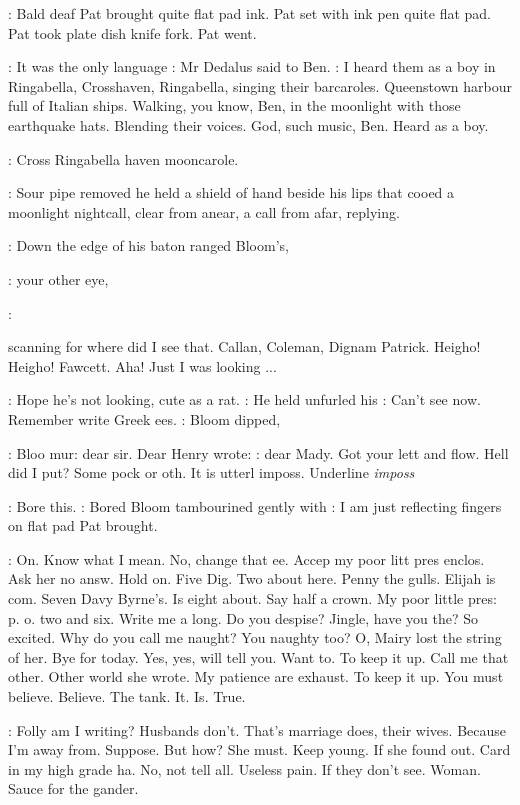 :
Bald deaf Pat brought quite flat pad ink. Pat set with ink pen quite
flat pad. Pat took plate dish knife fork. Pat went.

\Simon:
It was the only language
:
Mr Dedalus said to Ben.
\Simon:
I heard them as a
boy in Ringabella, Crosshaven, Ringabella,
singing their barcaroles.
Queenstown harbour full of Italian ships. Walking, you know, Ben, in the
moonlight with those earthquake hats. Blending their voices. God, such
music, Ben. Heard as a boy.

\BloomQ:
Cross Ringabella haven mooncarole.

:
Sour pipe removed he held a shield of hand beside his lips that cooed
a moonlight nightcall, clear from anear, a call from afar, replying.

:
Down the edge of his  baton ranged Bloom's,

\BloomQ:
your other eye,

\BloomInt:

scanning for where did I see that. Callan, Coleman, Dignam Patrick.
Heigho! Heigho! Fawcett. Aha! Just I was looking ...

\BloomInt:
Hope he's not looking, cute as a rat.
:
He held unfurled his 
\BloomInt:
Can't see now. Remember write Greek ees.
:
Bloom dipped,

\BloomInt:
Bloo mur: dear sir. Dear Henry wrote:
\BloomInt:
dear Mady. Got your lett and flow. Hell did I put?
Some pock or oth. It is utterl imposs. Underline
\emph{imposs}

\BloomInt:
Bore this.
:
Bored Bloom tambourined gently with
\BloomInt:
I am just reflecting
fingers on flat pad Pat brought.

\BloomInt:
On. Know what I mean. No, change that ee. Accep my poor litt pres
enclos. Ask her no answ. Hold on. Five Dig. Two about here. Penny the
gulls. Elijah is com. Seven Davy Byrne's. Is eight about. Say half a
crown. My poor little pres: p. o. two and six. Write me a long. Do you
despise? Jingle, have you the? So excited. Why do you call me naught?
You naughty too?
O, Mairy lost the string of her. Bye for today. Yes, yes,
will tell you. Want to. To keep it up. Call me that other. Other world she
wrote. My patience are exhaust. To keep it up. You must believe. Believe.
The tank. It. Is. True.

\BloomInt:
Folly am I writing? Husbands don't. That's marriage does, their
wives. Because I'm away from. Suppose. But how? She must. Keep young.
If she found out. Card in my high grade ha. No, not tell all. Useless
pain. If they don't see. Woman. Sauce for the gander.

